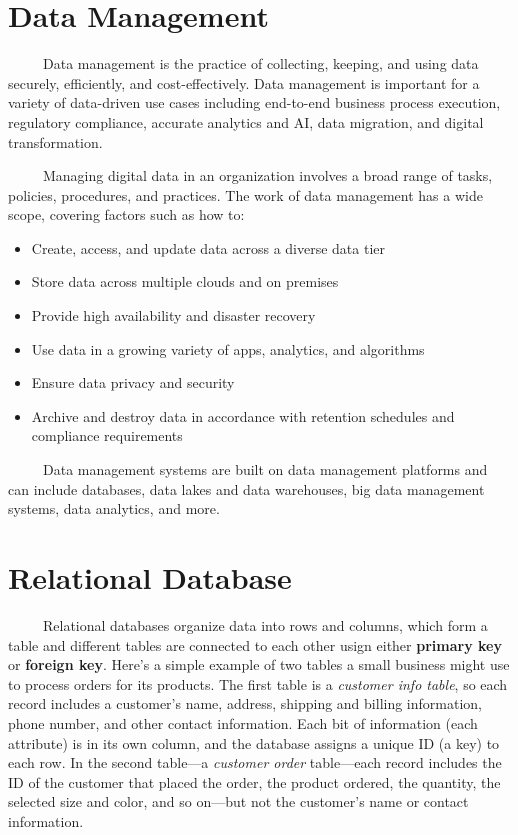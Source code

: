 \documentclass[
  letterpaper,
  DIV=11,
  numbers=noendperiod]{scrreprt}
\providecommand{\tightlist}{%
  \setlength{\itemsep}{0pt}\setlength{\parskip}{0pt}}
\begin{document}
\section{Data Management}\label{data-management}

~~~~~Data management is the practice of collecting, keeping, and using
data securely, efficiently, and cost-effectively. Data management is
important for a variety of data-driven use cases including end-to-end
business process execution, regulatory compliance, accurate analytics
and AI, data migration, and digital transformation.

~~~~~Managing digital data in an organization involves a broad range of
tasks, policies, procedures, and practices. The work of data management
has a wide scope, covering factors such as how to:

\begin{itemize}
\tightlist
\item
  Create, access, and update data across a diverse data tier
\item
  Store data across multiple clouds and on premises
\item
  Provide high availability and disaster recovery
\item
  Use data in a growing variety of apps, analytics, and algorithms
\item
  Ensure data privacy and security
\item
  Archive and destroy data in accordance with retention schedules and
  compliance requirements
\end{itemize}

~~~~~Data management systems are built on data management platforms and
can include databases, data lakes and data warehouses, big data
management systems, data analytics, and more.

\section{Relational Database}\label{relational-database}

~~~~~Relational databases organize data into rows and columns, which
form a table and different tables are connected to each other usign
either \textbf{primary key} or \textbf{foreign key}. Here's a simple
example of two tables a small business might use to process orders for
its products. The first table is a \emph{customer info table}, so each
record includes a customer's name, address, shipping and billing
information, phone number, and other contact information. Each bit of
information (each attribute) is in its own column, and the database
assigns a unique ID (a key) to each row. In the second table---a
\emph{customer order} table---each record includes the ID of the
customer that placed the order, the product ordered, the quantity, the
selected size and color, and so on---but not the customer's name or
contact information.
\end{document}
